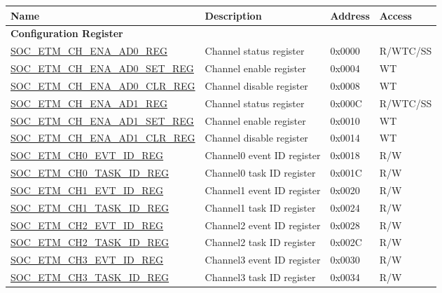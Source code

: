 \begin{longtable}{ | p{6cm} | p{6.4cm} | p{1.3cm} | p{1.8cm} | }
\hline\rowcolor{lightgray}
\textbf{Name} & \textbf{Description} &  \textbf{Address} & \textbf{Access} \\ \hline
\endhead
\multicolumn{4}{|l|}{\textbf{Configuration Register}} \\ \hline
\hyperref[regdesc:SOCETMCHENAAD0REG]{SOC\_ETM\_CH\_ENA\_AD0\_REG} & Channel status register & 0x0000 & R/WTC/SS \\ \hline
\hyperref[regdesc:SOCETMCHENAAD0SETREG]{SOC\_ETM\_CH\_ENA\_AD0\_SET\_REG} & Channel enable register & 0x0004 & WT \\ \hline
\hyperref[regdesc:SOCETMCHENAAD0CLRREG]{SOC\_ETM\_CH\_ENA\_AD0\_CLR\_REG} & Channel disable register & 0x0008 & WT \\ \hline
\hyperref[regdesc:SOCETMCHENAAD1REG]{SOC\_ETM\_CH\_ENA\_AD1\_REG} & Channel status register & 0x000C & R/WTC/SS \\ \hline
\hyperref[regdesc:SOCETMCHENAAD1SETREG]{SOC\_ETM\_CH\_ENA\_AD1\_SET\_REG} & Channel enable register & 0x0010 & WT \\ \hline
\hyperref[regdesc:SOCETMCHENAAD1CLRREG]{SOC\_ETM\_CH\_ENA\_AD1\_CLR\_REG} & Channel disable register & 0x0014 & WT \\ \hline
\hyperref[regdesc:SOCETMCH0EVTIDREG]{SOC\_ETM\_CH0\_EVT\_ID\_REG} & Channel0 event ID register & 0x0018 & R/W \\ \hline
\hyperref[regdesc:SOCETMCH0TASKIDREG]{SOC\_ETM\_CH0\_TASK\_ID\_REG} & Channel0 task ID register & 0x001C & R/W \\ \hline
\hyperref[regdesc:SOCETMCH0EVTIDREG]{SOC\_ETM\_CH1\_EVT\_ID\_REG} & Channel1 event ID register & 0x0020 & R/W \\ \hline
\hyperref[regdesc:SOCETMCH0TASKIDREG]{SOC\_ETM\_CH1\_TASK\_ID\_REG} & Channel1 task ID register & 0x0024 & R/W \\ \hline
\hyperref[regdesc:SOCETMCH0EVTIDREG]{SOC\_ETM\_CH2\_EVT\_ID\_REG} & Channel2 event ID register & 0x0028 & R/W \\ \hline
\hyperref[regdesc:SOCETMCH0TASKIDREG]{SOC\_ETM\_CH2\_TASK\_ID\_REG} & Channel2 task ID register & 0x002C & R/W \\ \hline
\hyperref[regdesc:SOCETMCH0EVTIDREG]{SOC\_ETM\_CH3\_EVT\_ID\_REG} & Channel3 event ID register & 0x0030 & R/W \\ \hline
\hyperref[regdesc:SOCETMCH0TASKIDREG]{SOC\_ETM\_CH3\_TASK\_ID\_REG} & Channel3 task ID register & 0x0034 & R/W \\ \hline

\end{longtable}
